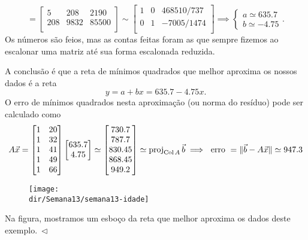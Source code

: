 \documentclass[../livro.tex]{subfiles}  %
\providecommand{\dir}{..}
\begin{document}
\begin{example}
  \begin{equation}
  [\, A^TA \ | \ \vec{b} \, ] =
  \begin{bmatrix}
    5    & 208 & 2190 \\
    208  & 9832 & 85500 \\
  \end{bmatrix} \sim
  \begin{bmatrix}
    1 & 0 & 468510/737 \\
    0 & 1 & -7005/1474 \\
  \end{bmatrix} \implies
  \left\{
    \begin{array}{ll}
      a \simeq 635.7 \\
      b \simeq -4.75
    \end{array}
  \right..
  \end{equation} Os números são feios, mas as contas feitas foram as que sempre fizemos ao escalonar uma matriz até sua forma escalonada reduzida.

  A conclusão é que a reta de mínimos quadrados que melhor aproxima os nossos dados é a reta
  \begin{equation}
  y = a + b x = 635.7 - 4.75 x.
  \end{equation} O erro de mínimos quadrados nesta aproximação (ou norma do resíduo) pode ser calculado como
  \begin{equation}
  A \vec{x} = \begin{bmatrix}
    1 & 20 \\
    1 & 32 \\
    1 & 41 \\
    1 & 49 \\
    1 & 66 \\
  \end{bmatrix}
  \begin{bmatrix}
    635.7 \\
    4.75 \\
  \end{bmatrix} \simeq
  \begin{bmatrix}
    730.7 \\
    787.7 \\
    830.45 \\
    868.45 \\
    949.2 \\
  \end{bmatrix} \simeq \operatorname{proj}_{\operatorname{Col} A} \vec{b} \implies \text{ erro } = \| \vec{b} - A\vec{x} \| \simeq 947.3
  \end{equation}
  \begin{figure}[h!]
    \begin{center}
      \texttt{[image: \\dir/Semana13/semana13-idade]}
    \end{center}
  \end{figure}
 Na figura, mostramos um esboço da reta que melhor aproxima os dados deste exemplo$. \ \lhd$
\end{example}
\end{document}
